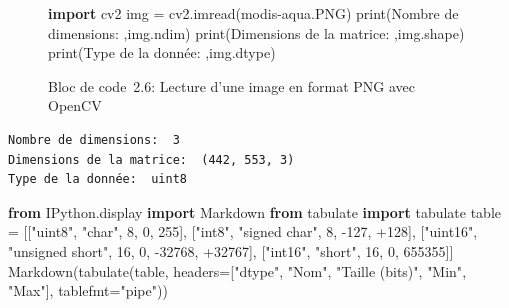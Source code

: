\documentclass[
]{article}
\newenvironment{Shaded}{}{}
\newcommand{\BuiltInTok}[1]{\textcolor[rgb]{0.00,0.50,0.00}{#1}}
\newcommand{\DecValTok}[1]{\textcolor[rgb]{0.25,0.63,0.44}{#1}}
\newcommand{\ImportTok}[1]{\textcolor[rgb]{0.00,0.50,0.00}{\textbf{#1}}}
\newcommand{\NormalTok}[1]{#1}
\newcommand{\OperatorTok}[1]{\textcolor[rgb]{0.40,0.40,0.40}{#1}}
\newcommand{\StringTok}[1]{\textcolor[rgb]{0.25,0.44,0.63}{#1}}
\begin{document}
\label{fba784a4}
\label{lst-numpyshape}
\begin{figure}
\centering
{}\label{lst-numpyshape}
\begin{Shaded}
\begin{Highlighting}[]
\ImportTok{import}\NormalTok{ cv2}
\NormalTok{img }\OperatorTok{=}\NormalTok{ cv2.imread(}\StringTok{\textquotesingle{}modis{-}aqua.PNG\textquotesingle{}}\NormalTok{)}
\BuiltInTok{print}\NormalTok{(}\StringTok{\textquotesingle{}Nombre de dimensions: \textquotesingle{}}\NormalTok{,img.ndim)}
\BuiltInTok{print}\NormalTok{(}\StringTok{\textquotesingle{}Dimensions de la matrice: \textquotesingle{}}\NormalTok{,img.shape)}
\BuiltInTok{print}\NormalTok{(}\StringTok{\textquotesingle{}Type de la donnée: \textquotesingle{}}\NormalTok{,img.dtype)}
\end{Highlighting}
\end{Shaded}
\caption{Bloc de code~2.6: Lecture d'une image en format PNG avec
OpenCV}
\end{figure}

\begin{verbatim}
Nombre de dimensions:  3
Dimensions de la matrice:  (442, 553, 3)
Type de la donnée:  uint8
\end{verbatim}

\label{cb9}
\begin{Shaded}
\begin{Highlighting}[]
\ImportTok{from}\NormalTok{ IPython.display }\ImportTok{import}\NormalTok{ Markdown}
\ImportTok{from}\NormalTok{ tabulate }\ImportTok{import}\NormalTok{ tabulate}
\NormalTok{table }\OperatorTok{=}\NormalTok{ [[}\StringTok{"uint8"}\NormalTok{, }\StringTok{"char"}\NormalTok{, }\DecValTok{8}\NormalTok{, }\DecValTok{0}\NormalTok{, }\DecValTok{255}\NormalTok{],}
\NormalTok{        [}\StringTok{"int8"}\NormalTok{, }\StringTok{"signed char"}\NormalTok{, }\DecValTok{8}\NormalTok{, }\OperatorTok{{-}}\DecValTok{127}\NormalTok{, }\OperatorTok{+}\DecValTok{128}\NormalTok{],}
\NormalTok{        [}\StringTok{"uint16"}\NormalTok{, }\StringTok{"unsigned short"}\NormalTok{, }\DecValTok{16}\NormalTok{, }\DecValTok{0}\NormalTok{, }\OperatorTok{{-}}\DecValTok{32768}\NormalTok{, }\OperatorTok{+}\DecValTok{32767}\NormalTok{],}
\NormalTok{        [}\StringTok{"int16"}\NormalTok{, }\StringTok{"short"}\NormalTok{, }\DecValTok{16}\NormalTok{, }\DecValTok{0}\NormalTok{, }\DecValTok{655355}\NormalTok{]]}
\NormalTok{Markdown(tabulate(table, headers}\OperatorTok{=}\NormalTok{[}\StringTok{"dtype"}\NormalTok{, }\StringTok{"Nom"}\NormalTok{, }\StringTok{"Taille (bits)"}\NormalTok{, }\StringTok{"Min"}\NormalTok{, }\StringTok{"Max"}\NormalTok{], tablefmt}\OperatorTok{=}\StringTok{"pipe"}\NormalTok{))}
\end{Highlighting}
\end{Shaded}
\end{document}
